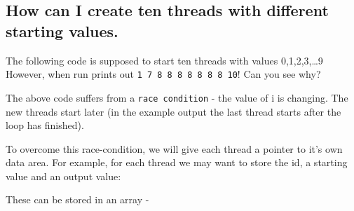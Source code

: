 \subsection{How can I create ten threads with different starting
values.}\label{how-can-i-create-ten-threads-with-different-starting-values.}

The following code is supposed to start ten threads with values
0,1,2,3,\ldots{}9\\However, when run prints out
\texttt{1\ 7\ 8\ 8\ 8\ 8\ 8\ 8\ 8\ 10}! Can you see why?

\begin{Shaded}
\end{Shaded}

The above code suffers from a \texttt{race\ condition} - the value of i
is changing. The new threads start later (in the example output the last
thread starts after the loop has finished).

To overcome this race-condition, we will give each thread a pointer to
it's own data area. For example, for each thread we may want to store
the id, a starting value and an output value:

\begin{Shaded}
\begin{Highlighting}[]
 
   
   \NormalTok{result[}\NormalTok{];}
\NormalTok{\}}
\end{Highlighting}
\end{Shaded}

These can be stored in an array -

